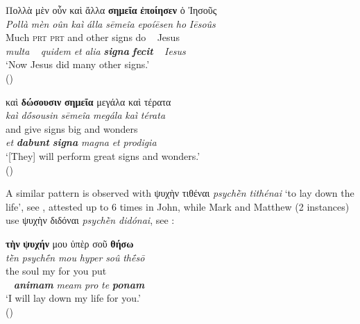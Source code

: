 \documentclass[output=paper,colorlinks,citecolor=brown]{langscibook}
\begin{document}

\ea\label{ex:bj:9}

\ea\label{ex:bj:9a}

\gllll Πολλὰ μὲν οὖν καὶ ἄλλα \textbf{σημεῖα} \textbf{ἐποίησεν} ὁ Ἰησοῦς\\
 \textit{Pollà} \textit{mèn} \textit{oûn} \textit{kaì} \textit{álla} \textit{sēmeîa} \textit{epoíēsen} \textit{ho} \textit{Iēsoûs}\\
Much \textsc{prt} \textsc{prt} and other signs do ~ Jesus\\
\emph{multa} ~ \emph{quidem} \emph{et} \emph{alia} \textbf{\itshape signa}
\textbf{\itshape fecit} ~ \emph{Iesus}\\
\glt `Now Jesus did many other signs.' \\
\hspace*{\fill}()

\ex\label{ex:bj:9b}

\gllll καὶ \textbf{δώσουσιν} \textbf{σημεῖα} μεγάλα καὶ τέρατα\\
 \textit{kaì} \textit{dṓsousin} \textit{sēmeîa} \textit{megála} \textit{kaì} \textit{térata}\\
and give signs big and wonders\\
\emph{et} \textbf{\itshape dabunt} \textbf{\itshape signa} \emph{magna} \emph{et} \emph{prodigia}\\
\glt `{[}They{]} will perform great signs and wonders.' \\
\hspace*{\fill}()

\z

\z


A similar pattern is observed with ψυχὴν
τιθέναι \emph{psychḕn tithénai} `to lay down the life', see , attested up to
6 times in John, while Mark and Matthew (2 instances) use ψυχὴν διδόναι \emph{psychḕn
  didónai}, see :


\ea\label{ex:bj:10}

\ea\label{ex:bj:10a}

\gllll \textbf{τὴν} \textbf{ψυχήν} μου ὑπὲρ σοῦ \textbf{θήσω}\\
 \textit{tḕn} \textit{psychḗn} \textit{mou} \textit{hyper} \textit{soû} \textit{thḗsō}\\
the soul my for you put\\
~ \textbf{\itshape animam} \emph{meam} \emph{pro} \emph{te} \textbf{\itshape ponam}\\
\glt `I will lay down my life for you.' \\
\hspace*{\fill}()
\end{document}
